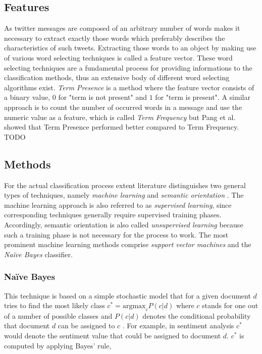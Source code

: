 \subsection{Features}
As twitter messages are composed of an arbitrary number of words makes it necessary to extract exactly those words which preferably describes the characteristics of such tweets. Extracting those words to an object by making use of various word selecting techniques is called a feature vector. These word selecting techniques are a fundamental process for providing informations to the classification methods, thus an extensive body of different word selecting algorithms exist. 
	\emph{Term Presence} is a method where the feature vector consists of a binary value, $0$ for "term is not present" and $1$ for "term is present". A similar approach is to count the number of occurred words in a message and use the numeric value as a feature, which is called \emph{Term Frequency} but Pang et al. showed \autocite{Pang2008} that Term Presence performed better compared to Term Frequency.
TODO

\subsection{Methods}

For the actual classification process extent literature distinguishes two general types of techniques, namely \emph{machine learning} and \emph{semantic orientation} \cite{Ye20096527}. The machine learning approach is also referred to as \emph{supervised learning}, since corresponding techniques generally require supervised training phases. Accordingly, semantic orientation is also called \emph{unsupervised learning} because such a training phase is not necessary for the process to work. The most prominent machine learning methods comprise \emph{support vector machines} and the \emph{Na\"ive Bayes} classifier.

\subsubsection*{Na\"ive Bayes}

This technique is based on a simple stochastic model that for a given document $d$ tries to find the most likely class $c^* = \mathrm{arg max}_c P(c \vert d)$ where $c$ stands for one out of a number of possible classes and $P(c \vert d)$ denotes the conditional probability that document $d$ can be assigned to $c$ \cite{Pang2002}. For example, in sentiment analysis $c^*$ would denote the sentiment value that could be assigned to document $d$. $c^*$ is computed by applying Bayes' rule,

